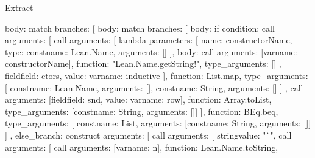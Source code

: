 \begin{lexlean}{Extract}
\begin{toolingmodule}
{{{{{              body: match{
                branches: [
                  {
                    body: match{
                      branches: [
                        {
                          body: if{
                            condition: call{
                              arguments: [
                                call{
                                  arguments: [
                                    lambda{
                                      parameters: [
                                        {
                                          name: constructorName,
                                          type: const{name: Lean.Name, arguments: []}
                                        }
                                      ],
                                      body: call{
                                        arguments: [var{name: constructorName}],
                                        function: "Lean.Name.getString!",
                                        type_arguments: []
                                      }
                                    },
                                    field{field: ctors, value: var{name: inductive}}
                                  ],
                                  function: List.map,
                                  type_arguments: [
                                    const{name: Lean.Name, arguments: []},
                                    const{name: String, arguments: []}
                                  ]
                                },
                                call{
                                  arguments: [field{field: snd, value: var{name: row}}],
                                  function: Array.toList,
                                  type_arguments: [const{name: String, arguments: []}]
                                }
                              ],
                              function: BEq.beq,
                              type_arguments: [
                                const{name: List, arguments: [const{name: String, arguments: []}]}
                              ]
                            },
                            else_branch: construct{
                              arguments: [
                                call{
                                  arguments: [
                                    string{value: "`"},
                                    call{
                                      arguments: [
                                        call{
                                          arguments: [var{name: n}],
                                          function: Lean.Name.toString,
}}}}}}}}}}}}}}
\end{toolingmodule}
\end{lexlean}
